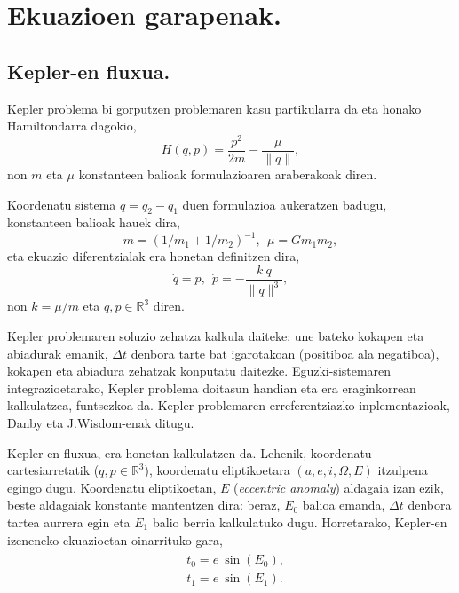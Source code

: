 \chapter{Ekuazioen garapenak.}
\label{eranskin:B}


\section{Kepler-en fluxua.}
\label{erans:B1}   
   
Kepler problema bi gorputzen problemaren kasu partikularra da eta  honako Hamiltondarra dagokio,
\begin{equation}
\label{eq: hamkepler}
H(q,p)=\frac{p^2}{2m}-\frac{\mu}{\|q\|},
\end{equation}
non $m$ eta $\mu$ konstanteen balioak  formulazioaren araberakoak diren.

Koordenatu sistema $q=q_2-q_1$ duen formulazioa aukeratzen badugu, konstanteen balioak hauek dira,  
\begin{equation*}
m=(1/m_1+1/m_2)^{-1},\ \ \mu=Gm_1m_2,
\end{equation*} 
%
eta ekuazio diferentzialak era honetan definitzen dira,
\begin{equation}
\label{eq:kode}
\dot{q}=p, \ \ \dot{p}= - \frac{k \ q}{\|q\|^3} ,
\end{equation}
non $k= \mu / m$ eta  $q,p \in \mathbb{R}^3$ diren.

Kepler problemaren soluzio zehatza kalkula daiteke: une bateko kokapen eta abiadurak emanik, $\Delta t$ denbora tarte bat igarotakoan (positiboa ala negatiboa), kokapen eta abiadura zehatzak konputatu daitezke. Eguzki-sistemaren integrazioetarako, Kepler problema doitasun handian eta era eraginkorrean kalkulatzea, funtsezkoa da. Kepler problemaren erreferentziazko inplementazioak, Danby \cite{Danby1992} eta J.Wisdom-enak  \cite{Wisdom2015} ditugu. 

Kepler-en fluxua, era honetan kalkulatzen da. Lehenik, koordenatu cartesiarretatik ($q,p\in \mathbb{R}^3$), koordenatu eliptikoetara $(a,e,i,\Omega,E)$ itzulpena egingo dugu. Koordenatu eliptikoetan, $E$ (\emph{eccentric anomaly}) aldagaia izan ezik, beste aldagaiak konstante mantentzen dira: beraz, $E_0$ balioa emanda, $\Delta t$ denbora tartea aurrera egin eta $E_1$ balio berria kalkulatuko dugu. Horretarako, Kepler-en izeneneko ekuazioetan oinarrituko gara,
\begin{align}
\begin{split}
&t_0=e \ \sin (E_0),\\
&t_1=e \ \sin (E_1).
\end{split}
\end{align}


